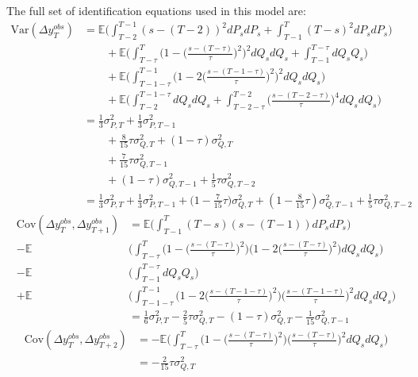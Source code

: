 The full set of identification equations used in this model are:
\begin{align}
\mathrm{Var}(\Delta y^{obs}_T) &= \mathbb{E} \Big(\int_{T-2}^{T-1} (s-(T-2))^2 dP_s dP_s  + \int_{T-1}^{T} (T-s)^2 dP_s dP_s \Big) \nonumber \\
& \qquad + \mathbb{E} \Big(\int_{T-\tau}^{T}\Big( 1 - \Big(\frac{s-(T-\tau)}{\tau}\Big)^2\Big)^2 dQ_s dQ_s +\int_{T-1}^{T-\tau}  dQ_s Q_s\Big) \nonumber \\
& \qquad + \mathbb{E} \Big(  \int_{T-1-\tau}^{T-1} \Big(1 - 2\Big(\frac{s-(T-1-\tau)}{\tau}\Big)^2 \Big)^2 dQ_s dQ_s \Big) \nonumber \\
& \qquad + \mathbb{E} \Big( \int_{T-2}^{T-1-\tau}  dQ_s dQ_s  +\int_{T-2-\tau}^{T-2} \Big(\frac{s-(T-2-\tau)}{\tau}\Big)^4 dQ_s dQ_s  \Big) \nonumber \\
&= \frac{1}{3}\sigma^2_{P,T} + \frac{1}{3}\sigma^2_{P,T-1} \nonumber \\
& \qquad + \frac{8}{15} \tau \sigma^2_{Q,T} + (1-\tau) \sigma^2_{Q,T} \nonumber \\
& \qquad + \frac{7}{15} \tau\sigma^2_{Q,T-1} \nonumber \\
& \qquad +(1-\tau) \sigma^2_{Q,T-1} + \frac{1}{5} \tau\sigma^2_{Q,T-2} \nonumber \\
&= \frac{1}{3}\sigma^2_{P,T} + \frac{1}{3}\sigma^2_{P,T-1} + \big(1-\frac{7}{15}\tau\big) \sigma^2_{Q,T}   +(1-\frac{8}{15}\tau) \sigma^2_{Q,T-1} + \frac{1}{5} \tau\sigma^2_{Q,T-2}
\end{align}
\begin{align}
\mathrm{Cov}(\Delta y^{obs}_T, \Delta y^{obs}_{T+1}) &=  \mathbb{E} \Big(\int_{T-1}^{T} (T-s)(s-(T-1)) dP_s dP_s  \Big) \nonumber \\
   -\mathbb{E}& \Big(\int_{T-\tau}^{T}\Big( 1 - \Big(\frac{s-(T-\tau)}{\tau}\Big)^2\Big) \Big( 1 - 2\Big(\frac{s-(T-\tau)}{\tau}\Big)^2\Big)  dQ_s dQ_s\Big) \nonumber\\
  -\mathbb{E}& \Big( \int_{T-1}^{T-\tau}  dQ_s Q_s\Big) \nonumber \\
  +\mathbb{E}& \Big( \int_{T-1-\tau}^{T-1}\Big( 1 - 2\Big(\frac{s-(T-1-\tau)}{\tau}\Big)^2\Big)  \Big(\frac{s-(T-1-\tau)}{\tau}\Big)^2 dQ_s dQ_s\Big) \nonumber \\
&= \frac{1}{6}\sigma^2_{P,T}  -\frac{2}{5}\tau \sigma^2_{Q,T}  -(1-\tau) \sigma^2_{Q,T}  -\frac{1}{15} \sigma^2_{Q,T-1} \nonumber 
\end{align}
\begin{align}
\mathrm{Cov}(\Delta y^{obs}_T, \Delta y^{obs}_{T+2}) &=  -\mathbb{E} \Big(\int_{T-\tau}^{T} \Big( 1 - \Big(\frac{s-(T-\tau)}{\tau}\Big)^2\Big) \Big(\frac{s-(T-\tau)}{\tau}\Big)^2 dQ_s dQ_s  \Big) \nonumber \\
&= -\frac{2}{15}\tau \sigma^2_{Q,T}
\end{align}
